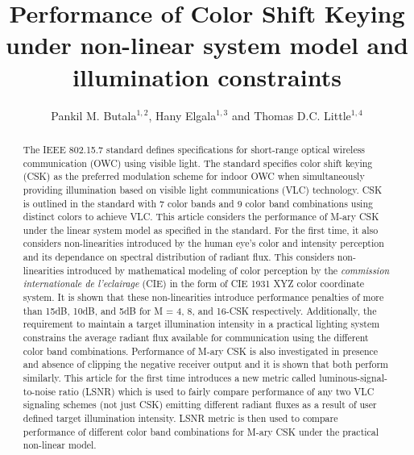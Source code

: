 \documentclass[10pt,letterpaper]{article}
\begin{document}
\title{Performance of Color Shift Keying under non-linear system model and illumination constraints}

\author{Pankil M. Butala$^{1,2}$, Hany Elgala$^{1,3}$ and Thomas D.C. Little$^{1,4}$}

\address{$^{1}$Multimedia Communication Laboratory and Smart Lighting Engineering Research Center\\
Boston University, Boston, MA 02215, USA\\
\{$^2$pbutala,$^3$helgala,$^4$tdcl\}@bu.edu}



\begin{abstract}
The IEEE 802.15.7 standard defines specifications for short-range optical wireless communication (OWC) using visible light. The standard specifies color shift keying (CSK) as the preferred modulation scheme for indoor OWC when simultaneously providing illumination based on visible light communications (VLC) technology. CSK is outlined in the standard with 7 color bands and 9 color band combinations using distinct colors to achieve VLC. This article considers the performance of M-ary CSK under the linear system model as specified in the standard. For the first time, it also considers non-linearities introduced by the human eye's color and intensity perception and its dependance on spectral distribution of radiant flux. This considers non-linearities introduced by mathematical modeling of color perception by the \textit{commission internationale de l'eclairage} (CIE) in the form of CIE 1931 XYZ color coordinate system. It is shown that these non-linearities introduce performance penalties of more than 15dB, 10dB, and 5dB for M = 4, 8, and 16-CSK respectively. Additionally, the requirement to maintain a target illumination intensity in a practical lighting system constrains the average radiant flux available for communication using the different color band combinations. {\color{red}Performance of M-ary CSK is also investigated in presence and absence of clipping the negative receiver output and it is shown that both perform similarly.} This article for the first time introduces a new metric called luminous-signal-to-noise ratio (LSNR) which is used to fairly compare performance of any two VLC signaling schemes (not just CSK) emitting different radiant fluxes as a result of user defined target illumination intensity. LSNR metric is then used to compare performance of different color band combinations for M-ary CSK under the practical non-linear model.
\end{abstract}
\end{document}
